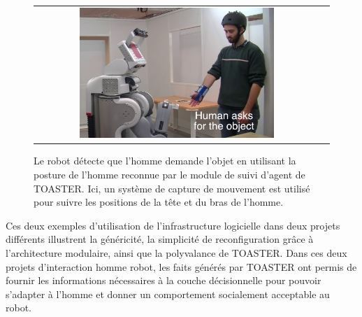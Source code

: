 \documentclass[a4paper,11pt,twoside]{StyleThese}
\begin{document}
 \begin{figure}[ht!]

 \centering
 \begin{tabular}{cc}
  \includegraphics[width=0.7\textwidth]{img/sapharishrink.png}
 \end{tabular}
 \caption{Le robot détecte que l'homme demande l'objet en utilisant la posture de l'homme reconnue par le module de suivi d'agent de TOASTER. Ici, un système de capture de mouvement est utilisé pour suivre les positions de la tête et du bras de l'homme.}
 \label{fig:saphari}
  \vspace{-15pt}
 \end{figure}
 
 
 Ces deux exemples d'utilisation de l'infrastructure logicielle dans deux projets différents illustrent la généricité, la simplicité de reconfiguration grâce à l'architecture modulaire, ainsi que la polyvalance de TOASTER. Dans ces deux projets d'interaction homme robot, les faits générés par TOASTER ont permis de fournir les informations nécessaires à la couche décisionnelle pour pouvoir s'adapter à l'homme et donner un comportement socialement acceptable au robot.

% 



\ifdefined{}
\else


\end{document}
